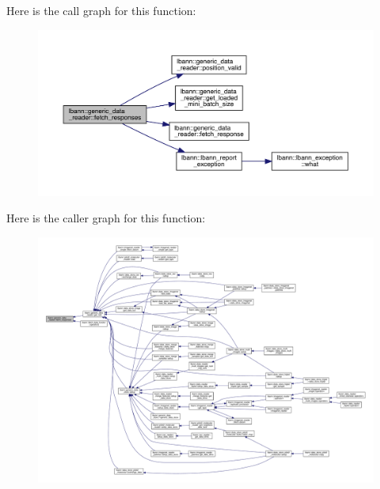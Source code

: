 Here is the call graph for this function\+:\nopagebreak
\begin{figure}[H]
\begin{center}
\leavevmode
\includegraphics[width=350pt]{classlbann_1_1generic__data__reader_aeaa97d3683add33d1c6d69a769dd6a20_cgraph}
\end{center}
\end{figure}
Here is the caller graph for this function\+:\nopagebreak
\begin{figure}[H]
\begin{center}
\leavevmode
\includegraphics[width=350pt]{classlbann_1_1generic__data__reader_aeaa97d3683add33d1c6d69a769dd6a20_icgraph}
\end{center}
\end{figure}
\mbox{\label{classlbann_1_1generic__data__reader_a1e8655cd1883d850566694bcf2ad60ab}} 
